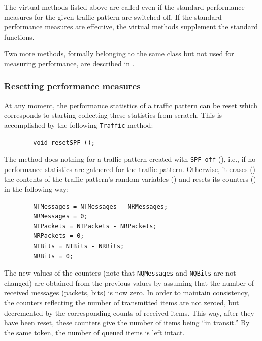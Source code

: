 The virtual methods listed above are called even if the standard performance
measures for the given traffic pattern are switched off.
If the standard performance measures are effective, the virtual methods
supplement the standard functions.

Two more methods, formally belonging to the same class but not used for
measuring performance, are described in .

\subsubsection{Resetting performance measures}
\label{rm_pm_cl_sw}

At any moment, the performance statistics of a traffic pattern can be
reset which
corresponds to starting collecting these statistics from scratch.
This is accomplished by the following {\tt Traffic} method:
\begin{verbatim}
        void resetSPF ();
\end{verbatim}

The method does nothing for a traffic pattern created with {\tt SPF\_off}
(), i.e., if no performance statistics are
gathered for the traffic pattern.
Otherwise, it erases () the contents of the
traffic pattern's random variables () and
resets its counters () in the following way:
\begin{verbatim}
        NTMessages = NTMessages - NRMessages;
        NRMessages = 0;
        NTPackets = NTPackets - NRPackets;
        NRPackets = 0;
        NTBits = NTBits - NRBits;
        NRBits = 0;
\end{verbatim}
The new values of the counters (note that {\tt NQMessages} and {\tt NQBits}
are not changed) are obtained from the previous values by assuming that
the number of received messages (packets, bits) is now zero.
In order to maintain consistency, the counters reflecting the number
of transmitted items are not zeroed, but decremented by the 
corresponding counts of received items.
This way, after they have been reset, these counters give the number
of items being ``in transit.''
By the same token, the number of queued items is left intact.

